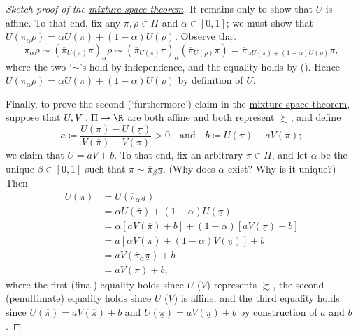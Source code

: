 \begin{proof}[Sketch proof of the {\hyperref[theorem:mix]{mixture-space theorem}}]
	It remains only to show that $U$ is affine. To that end, fix any $\pi,\rho \in \Pi$ and $\alpha \in [0,1]$; we must show that $U(\pi_\alpha \rho) = \alpha U(\pi) + (1-\alpha) U(\rho)$. Observe that
	\begin{equation*}
		\pi_\alpha \rho
		\sim ( \overline{\pi}_{U(\pi)} \underline{\pi} )_\alpha \rho
		\sim ( \overline{\pi}_{U(\pi)} \underline{\pi} )_\alpha ( \overline{\pi}_{U(\rho)} \underline{\pi} )
		= \overline{\pi}_{\alpha U(\pi) + (1-\alpha) U(\rho)} \underline{\pi} ,
	\end{equation*}
	where the two `$\sim$'s hold by independence, and the equality holds by  (). Hence $U(\pi_\alpha \rho) = \alpha U(\pi) + (1-\alpha) U(\rho)$ by definition of $U$.

	Finally, to prove the second (`furthermore') claim in the \hyperref[theorem:mix]{mixture-space theorem}, suppose that $U,V : \Pi \to \R$ are both affine and both represent $\succsim$, and define
	\begin{equation*}
		a \coloneqq \frac{ U\left(\overline{\pi}\right) - U\left(\underline{\pi}\right) }{ V\left(\overline{\pi}\right) - V\left(\underline{\pi}\right) }
		> 0
		\quad \text{and} \quad
		b \coloneqq U\left(\underline{\pi}\right) - a V\left(\underline{\pi}\right) ;
	\end{equation*}
	we claim that $U = a V + b$. To that end, fix an arbitrary $\pi \in \Pi$, and let $\alpha$ be the unique $\beta \in [0,1]$ such that $\pi \sim \overline{\pi}_\beta \underline{\pi}$. (Why does $\alpha$ exist? Why is it unique?) Then
	\begin{align*}
		U(\pi)
		&= U\left( \overline{\pi}_\alpha \underline{\pi} \right)
		\\
		&= \alpha U\left(\overline{\pi}\right)
		+ (1-\alpha) U\left(\underline{\pi}\right)
		\\
		&= \alpha \left[ a V\left(\overline{\pi}\right) + b \right]
		+ (1-\alpha) \left[ a V\left(\underline{\pi}\right) + b \right]
		\\
		&= a \left[ \alpha V\left(\overline{\pi}\right)
		+ (1-\alpha) V\left(\underline{\pi}\right) \right] + b
		\\
		&= a V\left( \overline{\pi}_\alpha \underline{\pi} \right) + b
		\\
		&= a V(\pi) + b ,
	\end{align*}
	where the first (final) equality holds since $U$ ($V$) represents $\succsim$, the second (penultimate) equality holds since $U$ ($V$) is affine, and the third equality holds since $U\left(\overline{\pi}\right) = a V\left(\overline{\pi}\right) + b$ and $U\left(\underline{\pi}\right) = a V\left(\underline{\pi}\right) + b$ by construction of $a$ and $b$.
\end{proof}

